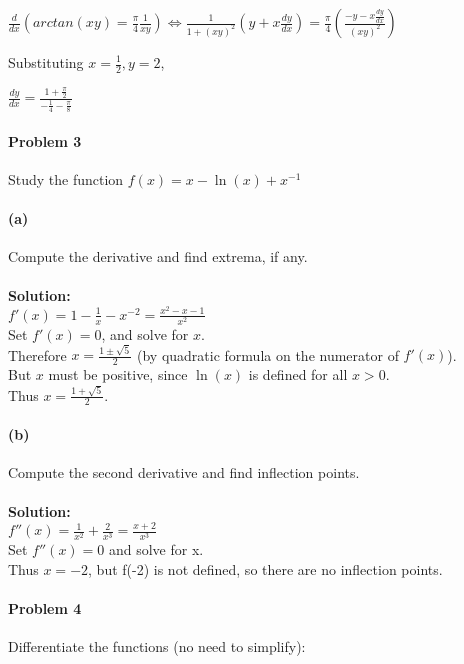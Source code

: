 \documentclass[a4paper,11pt]{article}
\begin{document}
\begin{center}
$\frac{d}{dx}\left(arctan(xy) = \frac{\pi}{4}\frac{1}{xy}\right) 
\Leftrightarrow 
\frac{1}{1+(xy)^2} \left(y + x\frac{dy}{dx}\right) = \frac{\pi}{4}\left(\frac{-y - x\frac{dy}{dx}}{(xy)^2}\right)$ \\
\end{center}
Substituting $x = \frac{1}{2}, y = 2$,
\begin{center}
$\frac{dy}{dx} = \frac{1+\frac{\pi}{2}}{-\frac{1}{4}-\frac{\pi}{8}}$
\end{center}

\paragraph{Problem 3}
Study the function $f(x) = x - \ln(x) + x^{-1}$
\paragraph{(a)} Compute the derivative and find extrema, if any. \\ \\
\textbf{Solution:} \\
$f ' (x) = 1 - \frac{1}{x} - x^{-2} = \frac{x^2 - x - 1}{x^2}$ \\
Set $f ' (x) = 0$, and solve for $x$. \\
Therefore $x = \frac{1 \pm \sqrt{5}}{2}$ (by quadratic formula on the
numerator of $f ' (x)$). \\
But $x$ must be positive, since $\ln(x)$ is defined for all $x > 0$. \\
Thus $x = \frac{1 + \sqrt{5}}{2}$.

\paragraph{(b)} Compute the second derivative and find inflection points.
\\ \\
\textbf{Solution:} \\
$f ''(x) = \frac{1}{x^2} + \frac{2}{x^3} = \frac{x+2}{x^3}$ \\ 
Set $f ''(x) = 0$ and solve for x. \\
Thus $x = -2$, but f(-2) is not defined, so there are no inflection points.

\newpage

\paragraph{Problem 4} Differentiate the functions (no need to simplify):
\end{document}
